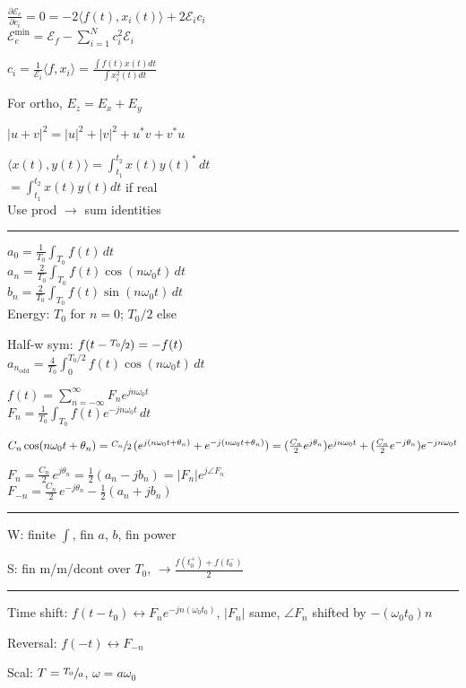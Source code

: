 \documentclass[4pt]{article}
\theoremstyle{definition}
\theoremstyle{definition}
\renewcommand{\o}{\omega}
\newcommand{\ra}{\rightarrow}
\newcommand{\lra}{\leftrightarrow}
\begin{document}
\begin{multicols}{3}
    $\frac{\partial \mathcal{E}_e}{\partial c_i} = 0 = -2 \langle f(t), x_i(t)\rangle + 2\mathcal{E}_i c_i$\\
    $\mathcal{E}_e^{\text{min}} = \mathcal{E}_f - \sum_{i=1}^N c_i^2 \mathcal{E}_i$

    \(c_i = \frac{1}{\mathcal{E}_i}\langle f, x_i\rangle = \frac{\int f(t) x(t) dt}{\int x_i^2(t) dt}\)    

    For ortho, $E_z = E_x + E_y$
        

    $|u+v|^2 = |u|^2 + |v|^2 + u^*v + v^*u$

    $\langle x(t), y(t)\rangle = \int_{t_1}^{t_2} x(t) y(t)^* \, dt$\\
    \( = \int_{t_1}^{t_2} x(t) y(t) dt\) if real\\
    Use prod $\ra$ sum identities
\rule{\linewidth}{0.5pt}
    $a_0 = \frac{1}{T_0} \int_{T_0} f(t)\, dt$\\
    $a_n = \frac{2}{T_0} \int_{T_0} f(t) \cos(n\o_0t)\,dt$\\
    $b_n = \frac{2}{T_0} \int_{T_0} f(t) \sin(n\o_0t)\,dt$\\
    Energy: $T_0$ for $n=0$; $T_0/2$ else
     
    Half-w sym: $f(t - \sfrac{T_0}{2}) = -f(t)$\\
    $a_{n_\mathrm{odd}} = \frac{4}{T_0}\int_{0}^{T_0/2} f(t) \cos (n\o_0 t) \, dt$

    $f(t) = \sum_{n=-\infty}^{\infty} F_n e^{jn\o_0 t}$\\
    $F_n = \frac{1}{T_0}\int_{T_0} f(t) e^{-jn\o_0t}\,dt$

    $C_n\cos(n\o_0 t + \theta_n) = \sfrac{C_n}{2} \, (e^{j(n\o_0t + \theta_n)} + e^{-j(n\o_0 t + \theta_n)}) = (\frac{C_n} 2 e^{j\theta_n}) e^{jn\o_0 t} + (\frac{C_n} 2 e^{-j\theta_n}) e^{-jn\o_0 t}$

    $F_n = \frac{C_n}{2}\, e^{j\theta_n} = \frac 1 2 (a_n - jb_n) = |F_n| e^{j\angle F_n}$\\
    $F_{-n} = \frac{C_n}{2}\, e^{-j\theta_n} - \frac 1 2 (a_n + jb_n)$  %
\rule{\linewidth}{0.5pt}
    W: finite $\int$, fin $a$, $b$, fin power

    S: fin m/m/dcont over $T_0$, $\ra \frac{f(t_0^+) + f(t_0^-)}{2}$
\rule{\linewidth}{0.5pt}
    Time shift: $f(t-t_0)\lra F_n e^{-jn(\o_0 t_0)}$, $|F_n|$ same, $\angle F_n$ shifted by $-(\o_0 t_0)n$

    Reversal: $f(-t)\lra F_{-n}$

    Scal: $T = \sfrac {T_0} a$, $\o = a\o_0$


\end{multicols}
\end{document}

